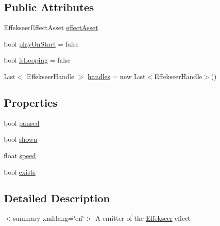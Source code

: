 \subsection*{Public Attributes}
\begin{DoxyCompactItemize}
\item 
Effekseer\-Effect\-Asset \hyperlink{class_effekseer_1_1_effekseer_emitter_abba9195b883a45a4bcc6dcc626173ce9}{effect\-Asset}
\item 
bool \hyperlink{class_effekseer_1_1_effekseer_emitter_a1ab61ce092db278b2a445078e66a3330}{play\-On\-Start} = false
\item 
bool \hyperlink{class_effekseer_1_1_effekseer_emitter_a99a9a243268bc3fe5e8fa0ea70a85934}{is\-Looping} = false
\item 
List$<$ Effekseer\-Handle $>$ \hyperlink{class_effekseer_1_1_effekseer_emitter_ad7e2bed3f504aa6eb954d0bb95b0353c}{handles} = new List$<$Effekseer\-Handle$>$()
\end{DoxyCompactItemize}
\subsection*{Properties}
\begin{DoxyCompactItemize}
\item 
bool \hyperlink{class_effekseer_1_1_effekseer_emitter_a82833cae53fe0dcb97fe711aae550fd0}{paused}
\item 
bool \hyperlink{class_effekseer_1_1_effekseer_emitter_af1aadf706ac894eb55fc3cfbf9382294}{shown}
\item 
float \hyperlink{class_effekseer_1_1_effekseer_emitter_a0cbf08f0a3908780bfbe6933cc5baf1e}{speed}
\item 
bool \hyperlink{class_effekseer_1_1_effekseer_emitter_ad45907c3a74d2c7d3c6e673788362577}{exists}
\end{DoxyCompactItemize}


\subsection{Detailed Description}
$<$summary xml\-:lang=\char`\"{}en\char`\"{}$>$ A emitter of the \hyperlink{namespace_effekseer}{Effekseer} effect 

